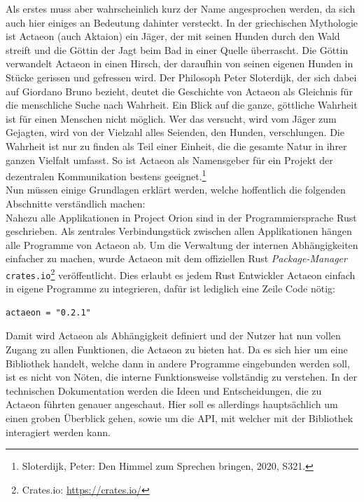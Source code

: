 \documentclass[a4paper,11pt,titlepage,twoside]{memoir}
\begin{document}
\noindent Als erstes muss aber wahrscheinlich kurz der Name
angesprochen werden, da sich auch hier einiges an Bedeutung dahinter
versteckt. In der griechischen Mythologie ist Actaeon (auch Aktaion)
ein Jäger, der mit seinen Hunden durch den Wald streift und die Göttin
der Jagt beim Bad in einer Quelle überrascht. Die Göttin verwandelt
Actaeon in einen Hirsch, der daraufhin von seinen eigenen Hunden in
Stücke gerissen und gefressen wird. Der Philosoph Peter Sloterdijk,
der sich dabei auf Giordano Bruno bezieht, deutet die Geschichte von
Actaeon als Gleichnis für die menschliche Suche nach Wahrheit. Ein
Blick auf die ganze, göttliche Wahrheit ist für einen Menschen nicht
möglich. Wer das versucht, wird vom Jäger zum Gejagten, wird von der
Vielzahl alles Seienden, den Hunden, verschlungen. Die Wahrheit ist
nur zu finden als Teil einer Einheit, die die gesamte Natur in ihrer
ganzen Vielfalt umfasst. So ist Actaeon als Namensgeber für ein
Projekt der dezentralen Kommunikation bestens geeignet.\footnote{Sloterdijk, Peter: Den Himmel zum Sprechen bringen, 2020, S321.\label{org808ec91}}\\

\noindent Nun müssen einige Grundlagen erklärt werden, welche
hoffentlich die folgenden Abschnitte verständlich machen:\\
Nahezu alle Applikationen in Project Orion sind in der
Programmiersprache Rust geschrieben. Als zentrales Verbindungstück
zwischen allen Applikationen hängen alle Programme von Actaeon ab. Um
die Verwaltung der internen Abhängigkeiten einfacher zu machen, wurde
Actaeon mit dem offiziellen Rust \emph{Package-Manager} \texttt{crates.io}\footnote{Crates.io: \url{https://crates.io/}\label{org865c7f7}}
veröffentlicht. Dies erlaubt es jedem Rust Entwickler Actaeon einfach
in eigene Programme zu integrieren, dafür ist lediglich eine Zeile
Code nötig:
\begin{verbatim}
actaeon = "0.2.1"
\end{verbatim}
\noindent Damit wird Actaeon als Abhängigkeit definiert und der Nutzer
hat nun vollen Zugang zu allen Funktionen, die Actaeon zu bieten hat.
Da es sich hier um eine Bibliothek handelt, welche dann in andere
Programme eingebunden werden soll, ist es nicht von Nöten, die interne
Funktionsweise vollständig zu verstehen. In der technischen
Dokumentation werden die Ideen und Entscheidungen, die zu Actaeon
führten genauer angeschaut. Hier soll es allerdings hauptsächlich um
einen groben Überblick gehen, sowie um die API, mit welcher mit der
Bibliothek interagiert werden kann.\\
\end{document}
